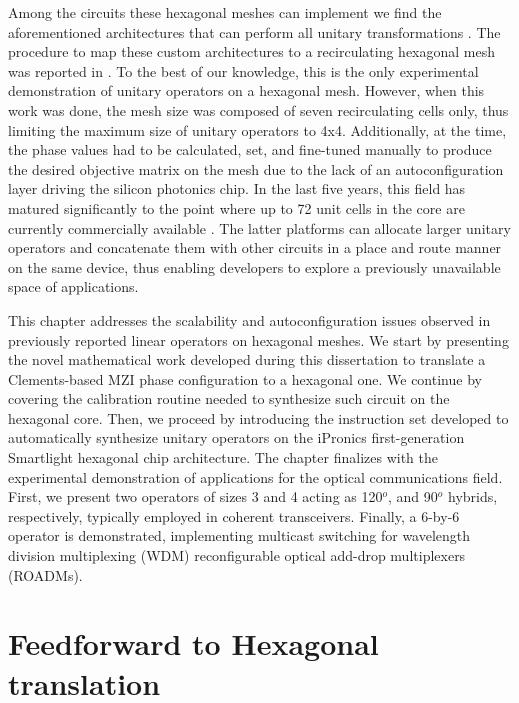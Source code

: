 Among the circuits these hexagonal meshes can implement we find the aforementioned architectures that can perform all unitary transformations \cite{carolan_universal_2015, clements_optimal_2016}.
The procedure to map these custom architectures to a recirculating hexagonal mesh was reported in \cite{perez_silicon_2017}.
To the best of our knowledge, this is the only experimental demonstration of unitary operators on a hexagonal mesh.
However, when this work was done, the mesh size was composed of seven recirculating cells only, thus limiting the maximum size of unitary operators to 4x4.
Additionally, at the time, the phase values had to be calculated, set, and fine-tuned manually to produce the desired objective matrix on the mesh due to the lack of an autoconfiguration layer driving the silicon photonics chip.
In the last five years, this field has matured significantly to the point where up to 72 unit cells in the core are currently commercially available \cite{perez-lopez_general-purpose_2024}.
The latter platforms can allocate larger unitary operators and concatenate them with other circuits in a place and route manner on the same device, thus enabling developers to explore a previously unavailable space of applications.

This chapter addresses the scalability and autoconfiguration issues observed in previously reported linear operators on hexagonal meshes.
We start by presenting the novel mathematical work developed during this dissertation to translate a Clements-based MZI phase configuration to a hexagonal one.
We continue by covering the calibration routine needed to synthesize such circuit on the hexagonal core.
Then, we proceed by introducing the instruction set developed to automatically synthesize unitary operators on the iPronics first-generation Smartlight hexagonal chip architecture.
The chapter finalizes with the experimental demonstration of applications for the optical communications field.
First, we present two operators of sizes 3 and 4 acting as 120$^o$, and 90$^o$ hybrids, respectively, typically employed in coherent transceivers.
Finally, a 6-by-6 operator is demonstrated, implementing multicast switching for wavelength division multiplexing (WDM) reconfigurable optical add-drop multiplexers (ROADMs).

\section{Feedforward to Hexagonal translation}\label{sec:feedforward_to_hexagonal_translation} %

